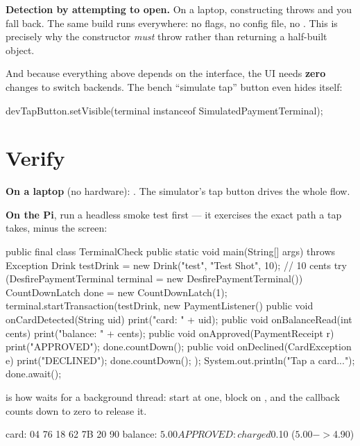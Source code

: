 \textbf{Detection by attempting to open.} On a laptop, constructing
 throws and you fall back. The same build runs everywhere: no
flags, no config file, no . This is precisely why the constructor
\emph{must} throw rather than returning a half-built object.

And because everything above depends on the interface, the UI needs
\textbf{zero} changes to switch backends. The bench ``simulate tap'' button even
hides itself:

\begin{jcode}
devTapButton.setVisible(terminal instanceof SimulatedPaymentTerminal);
\end{jcode}

\section{Verify}

\textbf{On a laptop} (no hardware): .
The simulator's tap button drives the whole flow.

\textbf{On the Pi}, run a headless smoke test first --- it exercises the exact
path a tap takes, minus the screen:

\begin{jcode}
public final class TerminalCheck {
    public static void main(String[] args) throws Exception {
        Drink testDrink = new Drink("test", "Test Shot", 10);   // 10 cents
        try (DesfirePaymentTerminal terminal = new DesfirePaymentTerminal()) {
            CountDownLatch done = new CountDownLatch(1);
            terminal.startTransaction(testDrink, new PaymentListener() {
                public void onCardDetected(String uid)   { print("card: " + uid); }
                public void onBalanceRead(int cents)     { print("balance: " + cents); }
                public void onApproved(PaymentReceipt r) { print("APPROVED"); done.countDown(); }
                public void onDeclined(CardException e)  { print("DECLINED"); done.countDown(); }
            });
            System.out.println("Tap a card...");
            done.await();
        }
    }
}
\end{jcode}

 is how  waits for a background thread: start at
one, block on , and the callback counts down to zero to release it.

\begin{verifybox}
\begin{trace}
  card: 04 76 18 62 7B 20 90
  balance: $5.00
  APPROVED: charged $0.10  ($5.00 -> $4.90)
\end{trace}
\end{verifybox}


